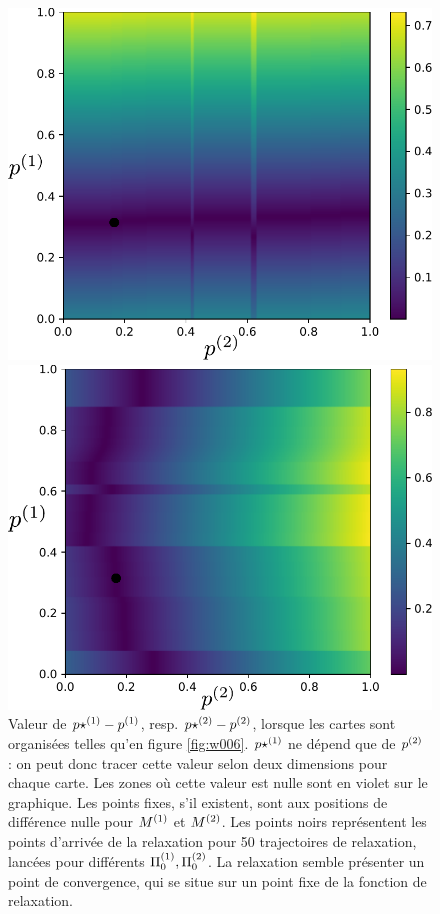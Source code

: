 \begin{figure}
\begin{minipage}{0.5\textwidth}
\centering
\includegraphics[width=\textwidth]{champ_X_006_notraj.pdf}
\end{minipage}
\begin{minipage}{0.5\textwidth}
\centering
\includegraphics[width=\textwidth]{champ_Y_006_notraj.pdf}
\end{minipage}
\caption{Valeur de ${p\star}^{({1})} - p^{({1})}$, resp. ${p\star}^{({2})} - p^{({2})}$, lorsque les cartes sont organisées telles qu'en figure \ref{fig:w006}. ${p\star}^{({1})}$ ne dépend que de $p^{({2})}$ : on peut donc tracer cette valeur selon deux dimensions pour chaque carte. Les zones où cette valeur est nulle sont en violet sur le graphique. Les points fixes, s'il existent, sont aux positions de différence nulle pour $M^{({1})}$ et $M^{({2})}$. Les points noirs représentent les points d'arrivée de la relaxation pour 50 trajectoires de relaxation, lancées pour différents $\Pi_0^{({1})}, \Pi_0^{({2})}$. La relaxation semble présenter un point de convergence, qui se situe sur un point fixe de la fonction de relaxation.}
\label{fig:diff_relax_notraj}
\end{figure}

